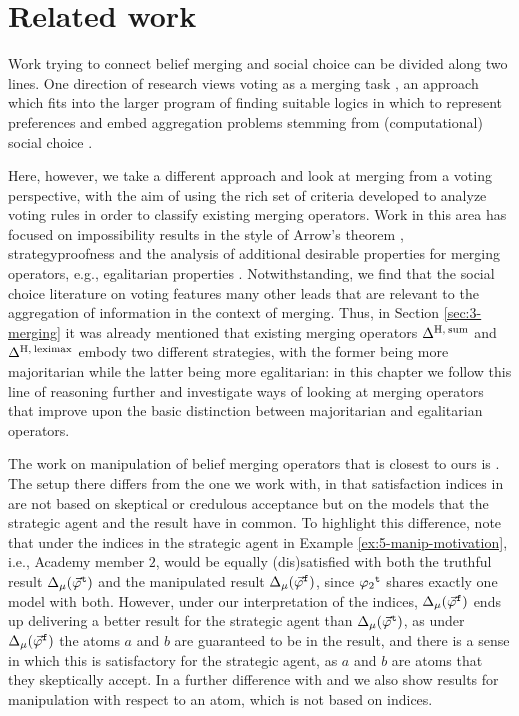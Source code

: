 \section{Related work}\label{sec:5-rw}
Work trying to connect belief merging and social choice 
can be divided along two lines.
One direction of research views voting as a merging task \cite{EckertP05,GabbayPR07}, 
an approach which fits into the larger program of finding suitable logics in which 
to represent preferences and embed aggregation problems stemming 
from (computational) social choice \cite{ChevaleyreELM08,Endriss11}. 

Here, however, we take a different approach 
and look at merging from a voting perspective,
with the aim of using the rich set of criteria 
developed to analyze voting rules 
in order to classify existing merging operators. 
Work in this area has focused on 
impossibility results in the style of Arrow's theorem 
\cite{Maynard-ZhangL03,KoniecznyP05,ChopraGM06,DiazP17},
strategyproofness \cite{EveraereKM07,DiazP18} 
and the analysis of additional desirable properties for merging operators,
e.g., egalitarian properties \cite{EveraereKM14}.
Notwithstanding, we find 
that the social choice literature on voting features many other 
leads that are relevant to the aggregation of information in the context of merging.
Thus, in Section \ref{sec:3-merging} it was already mentioned that existing 
merging operators $\Delta^{{\operatorname{H}},\:{\operatorname{sum}}}$ and $\Delta^{{\operatorname{H}},\:{\operatorname{leximax}}}$
embody two different strategies,
with the former being more majoritarian while the latter being more egalitarian:
in this chapter we follow this line of reasoning further 
and investigate ways of looking at 
merging operators that improve upon the basic distinction between
majoritarian and egalitarian operators.

The work on manipulation of belief merging operators that is closest 
to ours is \cite{EveraereKM07}. The setup there differs from the one we work with,
in that satisfaction indices in \cite{EveraereKM07} 
are not based on skeptical or credulous acceptance but 
on the models that the strategic agent
and the result have in common. 
To highlight this difference, note that under the indices in \cite{EveraereKM07}
the strategic agent in Example \ref{ex:5-manip-motivation}, i.e., Academy member $2$,
would be equally (dis)satisfied with both the truthful result 
$\Delta_{\mu}({{\vec{\varphi}}}^{\mathtt{t}})$ and the manipulated result $\Delta_{\mu}({{\vec{\varphi}}}^{\mathtt{f}})$, since
${\varphi_2}^{\mathtt{t}}$ shares exactly one model with both. 
However, under our interpretation of the indices,
$\Delta_{\mu}({{\vec{\varphi}}}^{\mathtt{f}})$ ends up
delivering a better result for the strategic agent than $\Delta_{\mu}({{\vec{\varphi}}}^{\mathtt{t}})$, 
as under $\Delta_{\mu}({{\vec{\varphi}}}^{\mathtt{f}})$ the atoms $a$ and $b$ are guaranteed to be in the result, 
and there is a sense in which this is satisfactory for the strategic agent, 
as $a$ and $b$ are atoms that they skeptically accept.
In a further difference with \cite{EveraereKM07} and \cite{DiazP18} 
we also show results for manipulation with respect to an atom, which is not based on indices. 

